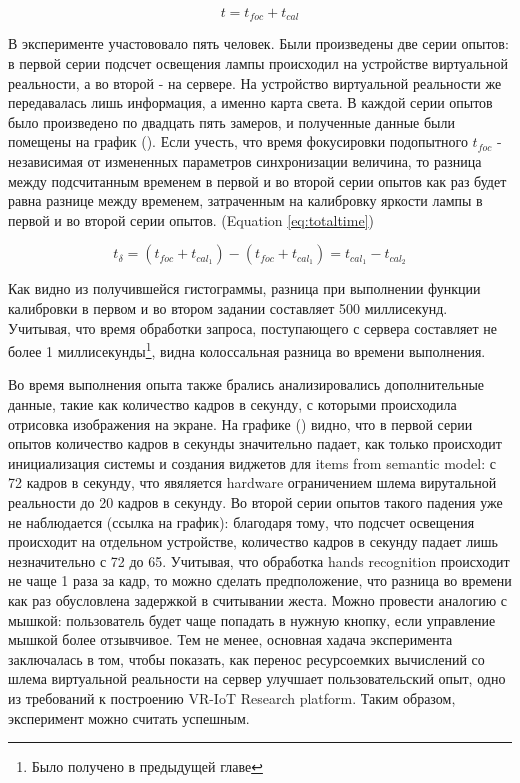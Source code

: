 \begin{equation}
  t = t_{foc} + t_{cal}
  \label{eq:totaltime}
\end{equation}

В эксперименте участововало пять человек. Были произведены две серии опытов: в первой серии подсчет освещения лампы происходил на устройстве виртуальной реальности, а во второй - на сервере. На устройство виртуальной реальности же передавалась лишь информация, а именно карта света. В каждой серии опытов было произведено по двадцать пять замеров, и полученные данные были помещены на график (). Если учесть, что время фокусировки подопытного $t_{foc}$ - независимая от измененных параметров синхронизации величина, то разница между подсчитанным временем в первой и во второй серии опытов как раз будет равна разнице между временем, затраченным на калибровку яркости лампы в первой и во второй серии опытов. (Equation \eqref{eq:totaltime})

\begin{equation}
  t_{\delta} = (t_{foc} + t_{cal_1}) - (t_{foc} + t_{cal_1}) = t_{cal_1} - t_{cal_2}
  \label{eq:deltatime}
\end{equation}

Как видно из получившейся гистограммы, разница при выполнении функции калибровки в первом и во втором задании составляет 500 миллисекунд. Учитывая, что время обработки запроса, поступающего с сервера составляет не более 1 миллисекунды\footnote{Было получено в предыдущей главе}, видна колоссальная разница во времени выполнения.

Во время выполнения опыта также брались анализировались дополнительные данные, такие как количество кадров в секунду, с которыми происходила отрисовка изображения на экране. На графике () видно, что в первой серии опытов количество кадров в секунды значительно падает, как только происходит инициализация системы и создания виджетов для items from semantic model: с 72 кадров в секунду, что явяляется hardware ограничением шлема вирутальной реальности до 20 кадров в секунду. Во второй серии опытов такого падения уже не наблюдается (ссылка на график): благодаря тому, что подсчет освещения происходит на отдельном устройстве, количество кадров в секунду падает лишь незначительно с 72 до 65. Учитывая, что обработка hands recognition происходит не чаще 1 раза за кадр, то можно сделать предположение, что разница во времени как раз обусловлена задержкой в считывании жеста. Можно провести аналогию с мышкой: пользователь будет чаще попадать в нужную кнопку, если управление мышкой более отзывчивое. Тем не менее, основная хадача эксперимента заключалась в том, чтобы показать, как перенос ресурсоемких вычислений со шлема виртуальной реальности на сервер улучшает пользовательский опыт, одно из требований к построению VR-IoT Research platform. Таким образом, эксперимент можно считать успешным.


